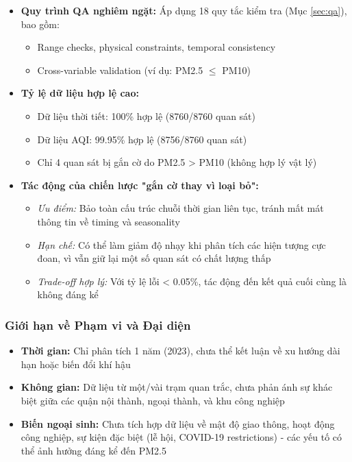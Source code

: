 \documentclass[12pt,a4paper]{article}
\begin{document}
\begin{itemize}
    \item \textbf{Quy trình QA nghiêm ngặt:} Áp dụng 18 quy tắc kiểm tra (Mục \ref{sec:qa}), bao gồm:
    \begin{itemize}
        \item Range checks, physical constraints, temporal consistency
        \item Cross-variable validation (ví dụ: PM2.5 $\leq$ PM10)
    \end{itemize}
    
    \item \textbf{Tỷ lệ dữ liệu hợp lệ cao:}
    \begin{itemize}
        \item Dữ liệu thời tiết: 100\% hợp lệ (8760/8760 quan sát)
        \item Dữ liệu AQI: 99.95\% hợp lệ (8756/8760 quan sát)
        \item Chỉ 4 quan sát bị gắn cờ do PM2.5 > PM10 (không hợp lý vật lý)
    \end{itemize}
    
    \item \textbf{Tác động của chiến lược "gắn cờ thay vì loại bỏ":}
    \begin{itemize}
        \item \textit{Ưu điểm:} Bảo toàn cấu trúc chuỗi thời gian liên tục, tránh mất mát thông tin về timing và seasonality
        \item \textit{Hạn chế:} Có thể làm giảm độ nhạy khi phân tích các hiện tượng cực đoan, vì vẫn giữ lại một số quan sát có chất lượng thấp
        \item \textit{Trade-off hợp lý:} Với tỷ lệ lỗi < 0.05\%, tác động đến kết quả cuối cùng là không đáng kể
    \end{itemize}
\end{itemize}

\subsubsection{Giới hạn về Phạm vi và Đại diện}

\begin{itemize}
    \item \textbf{Thời gian:} Chỉ phân tích 1 năm (2023), chưa thể kết luận về xu hướng dài hạn hoặc biến đổi khí hậu
    \item \textbf{Không gian:} Dữ liệu từ một/vài trạm quan trắc, chưa phản ánh sự khác biệt giữa các quận nội thành, ngoại thành, và khu công nghiệp
    \item \textbf{Biến ngoại sinh:} Chưa tích hợp dữ liệu về mật độ giao thông, hoạt động công nghiệp, sự kiện đặc biệt (lễ hội, COVID-19 restrictions) - các yếu tố có thể ảnh hưởng đáng kể đến PM2.5
\end{itemize}
\end{document}
